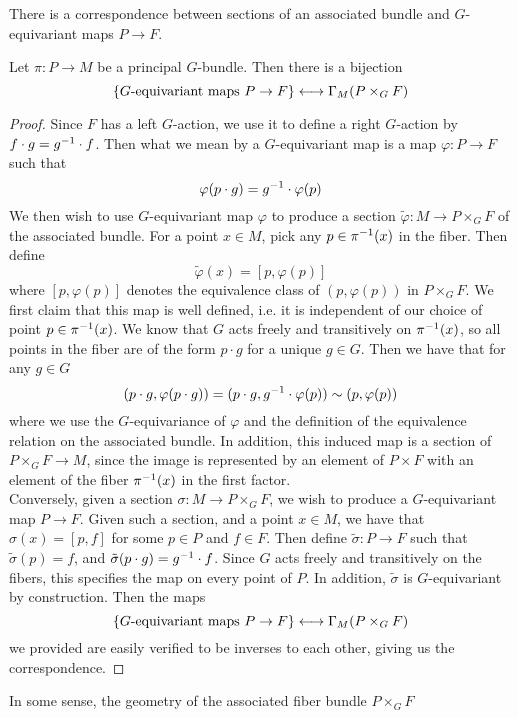 %
There is a correspondence between sections of an associated bundle and
$G$-equivariant maps $P \to F$.
%
\begin{prop}
Let $\pi : P \to M$ be a principal $G$-bundle. Then there is a bijection
\[
\left\lbrace G\text{-equivariant maps } P \to F \right\rbrace \longleftrightarrow \Gamma_M(P \times_G F)
\]
\end{prop}
%
\begin{proof}
Since $F$ has a left $G$-action, we use it to define a right $G$-action
by $f \cdot g = g^{-1} \cdot f$. Then what we mean by a $G$-equivariant map is
a map $\varphi : P \to F$ such that
\[
\varphi(p\cdot g) = g^{-1}\cdot \varphi(p)
\]
We then wish to use $G$-equivariant map $\varphi$ to produce a section
$\tilde{\varphi} : M \to P \times_G F$ of the associated bundle. For a
point $x \in M$, pick any $p \in \pi^{-1}(x)$ in the fiber. Then define
\[
\tilde{\varphi}(x) = [p, \varphi(p)]
\]
where $[p, \varphi(p)]$ denotes the equivalence class of $(p, \varphi(p))$ in
$P \times_G F$. We first claim that this map is well defined, i.e. it is
independent of our choice of point $p \in \pi^{-1}(x)$. We know that $G$ acts
freely and transitively on $\pi^{-1}(x)$, so all points in the fiber are of
the form $p \cdot g$ for a unique $g \in G$. Then we have that for any $g \in G$
\[
(p\cdot g, \varphi(p \cdot g)) = (p \cdot g, g^{-1} \cdot \varphi(p)) \sim (p, \varphi(p))
\]
where we use the $G$-equivariance of $\varphi$ and the definition of the equivalence
relation on the associated bundle. In addition, this induced map is
a section of $P \times_G F \to M$, since the image is represented by an
element of $P \times F$ with an element of the fiber $\pi^{-1}(x)$ in the first
factor. \\

Conversely, given a section $\sigma : M \to P \times_G F$, we wish to produce
a $G$-equivariant map $P \to F$. Given such a section, and a point $x \in M$,
we have that $\sigma(x) = [p, f]$ for some $p \in P$ and $f \in F$. Then
define $\tilde{\sigma} : P \to F$ such that $\tilde{\sigma}(p) = f$, and
$\tilde{\sigma}(p \cdot g) = g^{-1} \cdot f$. Since $G$ acts freely and transitively
on the fibers, this specifies the map on every
point of $P$. In addition, $\tilde{\sigma}$ is $G$-equivariant by construction.
Then the maps
\[
\left\lbrace G\text{-equivariant maps } P \to F \right\rbrace \longleftrightarrow \Gamma_M(P \times_G F)
\]
we provided are easily verified to be inverses to each other, giving us the
correspondence.
\end{proof}
%
In some sense, the geometry of the associated fiber bundle $P \times_G F$
